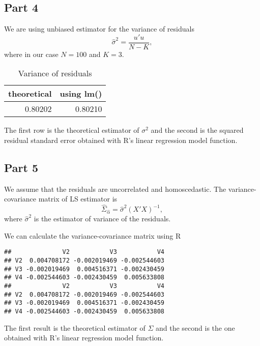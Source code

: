 \documentclass[12pt, a4paper]{article}\usepackage[]{graphicx}\usepackage[]{color}
\makeatletter
\newenvironment{kframe}{%
 \def\at@end@of@kframe{}%
 \ifinner\ifhmode%
  \def\at@end@of@kframe{\end{minipage}}%
  \begin{minipage}{\columnwidth}%
 \fi\fi%
 \def\FrameCommand##1{\hskip\@totalleftmargin \hskip-\fboxsep
 \colorbox{shadecolor}{##1}\hskip-\fboxsep
     \hskip-\linewidth \hskip-\@totalleftmargin \hskip\columnwidth}%
 \MakeFramed {\advance\hsize-\width
   \@totalleftmargin\z@ \linewidth\hsize
   \@setminipage}}%
 {\par\unskip\endMakeFramed%
 \at@end@of@kframe}
\newenvironment{knitrout}{}{} %
\makeatother
\begin{document}
\subsection{Part 4}
We are using unbiased estimator for the variance of residuals
\[ \hat{\sigma}^2 = \frac{u'u}{N-K},\]
where in our case $N=100$ and $K=3$. 
\begin{table}[H]
\centering
\begin{tabular}{rr}
  \hline
theoretical & using lm() \\ 
  \hline
0.80202 & 0.80210 \\ 
   \hline
\end{tabular}
\caption{Variance of residuals} 
\label{tab:table1}
\end{table}

The first row is the theoretical estimator of $\sigma^2$ and the second is the squared residual standard error obtained with R's linear regression model function.



\subsection{Part 5}

We assume that the residuals are uncorrelated and homoscedastic. The variance-covariance matrix of LS estimator is
\[ \hat{\Sigma}_{\hat{\alpha}} = \hat{\sigma}^2 (X'X)^{-1}, \]
where $\hat{\sigma}^2$ is the estimator of variance of the residuals.

We can calculate the variance-covariance matrix using R
\begin{knitrout}
\color{fgcolor}\begin{kframe}
\begin{verbatim}
##              V2           V3           V4
## V2  0.004708172 -0.002019469 -0.002544603
## V3 -0.002019469  0.004516371 -0.002430459
## V4 -0.002544603 -0.002430459  0.005633808
##              V2           V3           V4
## V2  0.004708172 -0.002019469 -0.002544603
## V3 -0.002019469  0.004516371 -0.002430459
## V4 -0.002544603 -0.002430459  0.005633808
\end{verbatim}
\end{kframe}
\end{knitrout}
The first result is the theoretical estimator of $\Sigma$ and the second is the one obtained with R's linear regression model function.
\end{document}
